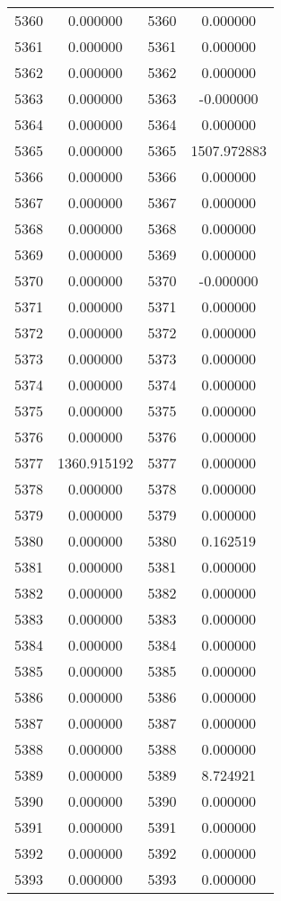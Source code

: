 \documentclass[12pt]{article}
\begin{document}
\begin{longtable}{@{}cccc@{}}
5360 & 0.000000 & 5360 & 0.000000 \\
5361 & 0.000000 & 5361 & 0.000000 \\
5362 & 0.000000 & 5362 & 0.000000 \\
5363 & 0.000000 & 5363 & -0.000000 \\
5364 & 0.000000 & 5364 & 0.000000 \\
5365 & 0.000000 & 5365 & 1507.972883 \\
5366 & 0.000000 & 5366 & 0.000000 \\
5367 & 0.000000 & 5367 & 0.000000 \\
5368 & 0.000000 & 5368 & 0.000000 \\
5369 & 0.000000 & 5369 & 0.000000 \\
5370 & 0.000000 & 5370 & -0.000000 \\
5371 & 0.000000 & 5371 & 0.000000 \\
5372 & 0.000000 & 5372 & 0.000000 \\
5373 & 0.000000 & 5373 & 0.000000 \\
5374 & 0.000000 & 5374 & 0.000000 \\
5375 & 0.000000 & 5375 & 0.000000 \\
5376 & 0.000000 & 5376 & 0.000000 \\
5377 & 1360.915192 & 5377 & 0.000000 \\
5378 & 0.000000 & 5378 & 0.000000 \\
5379 & 0.000000 & 5379 & 0.000000 \\
5380 & 0.000000 & 5380 & 0.162519 \\
5381 & 0.000000 & 5381 & 0.000000 \\
5382 & 0.000000 & 5382 & 0.000000 \\
5383 & 0.000000 & 5383 & 0.000000 \\
5384 & 0.000000 & 5384 & 0.000000 \\
5385 & 0.000000 & 5385 & 0.000000 \\
5386 & 0.000000 & 5386 & 0.000000 \\
5387 & 0.000000 & 5387 & 0.000000 \\
5388 & 0.000000 & 5388 & 0.000000 \\
5389 & 0.000000 & 5389 & 8.724921 \\
5390 & 0.000000 & 5390 & 0.000000 \\
5391 & 0.000000 & 5391 & 0.000000 \\
5392 & 0.000000 & 5392 & 0.000000 \\
5393 & 0.000000 & 5393 & 0.000000 \\

\end{longtable}
\end{document}
